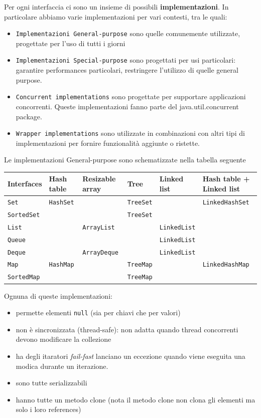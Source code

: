 \documentclass{article}
\begin{document}
Per ogni interfaccia ci sono un insieme di possibili \textbf{implementazioni}. In particolare abbiamo varie implementazioni per vari contesti, tra le quali:
\begin{itemize}
\item \texttt{Implementazioni General-purpose} sono quelle comunemente utilizzate, progettate per l'uso di tutti i giorni
\item \texttt{Implementazioni Special-purpose} sono progettati per usi particolari: garantire performances particolari, restringere l'utilizzo di quelle general purpose.
\item \texttt{Concurrent implementations} sono progettate per supportare applicazioni concorrenti. Queste implementazioni fanno parte del  java.util.concurrent package.
\item \texttt{Wrapper implementations} sono utilizzate in combinazioni con altri tipi di implementazioni per fornire funzionalit\`a aggiunte o ristette.
\end{itemize}

Le implementazioni General-purpose sono schematizzate nella tabella seguente 

\begin{tabular}{ | l | l | l | l | l | l |}
\hline
  Interfaces & Hash table  & Resizable array  & Tree  & Linked list  & Hash table + Linked list  \\
  \hline
  \texttt{Set} & \texttt{HashSet} &  & \texttt{TreeSet} && \texttt{LinkedHashSet} \\
  \hline
    \texttt{SortedSet} & &  & \texttt{TreeSet} &&  \\
  \hline
  \texttt{List} &  & \texttt{ArrayList}  & & \texttt{LinkedList} & \\
\hline  
  \texttt{Queue} &  & & & \texttt{LinkedList} &  \\
\hline  
  \texttt{Deque} &  & \texttt{ArrayDeque} & & \texttt{LinkedList} & \\
\hline  
  \texttt{Map} & \texttt{HashMap} & & \texttt{TreeMap} && \texttt{LinkedHashMap} \\
  \hline
    \texttt{SortedMap} & & & \texttt{TreeMap} &&  \\
\hline    
\end{tabular} 

Ognuna di queste implementazioni:
\begin{itemize}
\item permette elementi \texttt{null} (sia per chiavi che per valori)
\item non \`e sincronizzata (thread-safe): non adatta quando thread concorrenti devono modificare la collezione
\item ha degli itaratori \emph{fail-fast} lanciano un eccezione quando viene eseguita una modica durante un iterazione. 
\item sono tutte serializzabili
\item hanno tutte un metodo clone (nota il metodo clone non clona gli elementi ma solo i loro references)
\end{itemize}
\end{document}
